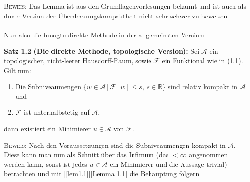 \textsc{Beweis:} Das Lemma ist aus den Grundlagenvorlesungen bekannt und ist auch als duale Version der Überdeckungskompaktheit nicht sehr schwer zu beweisen.\QEDB\\
\\
Nun also die besagte direkte Methode in der allgemeinsten Version:\\
\colorbox{theored}{\begin{minipage}{16cm}{\textcolor{black}{}{\label{theo1.2}}}
\textbf{Satz 1.2 (Die direkte Methode, topologische Version):} Sei \(\mathcal{A}\) ein topologischer, nicht-leerer Hausdorff-Raum, sowie \(\mathcal{F}\) ein Funktional wie in (1.1). Gilt nun:
\begin{enumerate}
    \item Die Subniveaumengen \(\{w \in \mathcal{A}\, | \, \mathcal{F}[w] \le s,\, s \in \mathbb{R}\}\) sind relativ kompakt in \(\mathcal{A}\) und
    \item \(\mathcal{F}\) ist unterhalbstetig auf \(\mathcal{A}\),
\end{enumerate}
dann existiert ein Minimierer \(u \in \mathcal{A}\) von \(\mathcal{F}\).
\end{minipage}}

\textsc{Beweis:} Nach den Voraussetzungen sind die Subniveaumengen kompakt in \(\mathcal{A}\). Diese kann man nun als Schnitt über das Infimum (das \(< \infty\) angenommen werden kann, sonst ist jedes \(u \in \mathcal{A}\) ein Minimierer und die Aussage trivial) betrachten und mit [\ref{lem1.1}][Lemma 1.1] die Behauptung folgern.\QEDB\\

